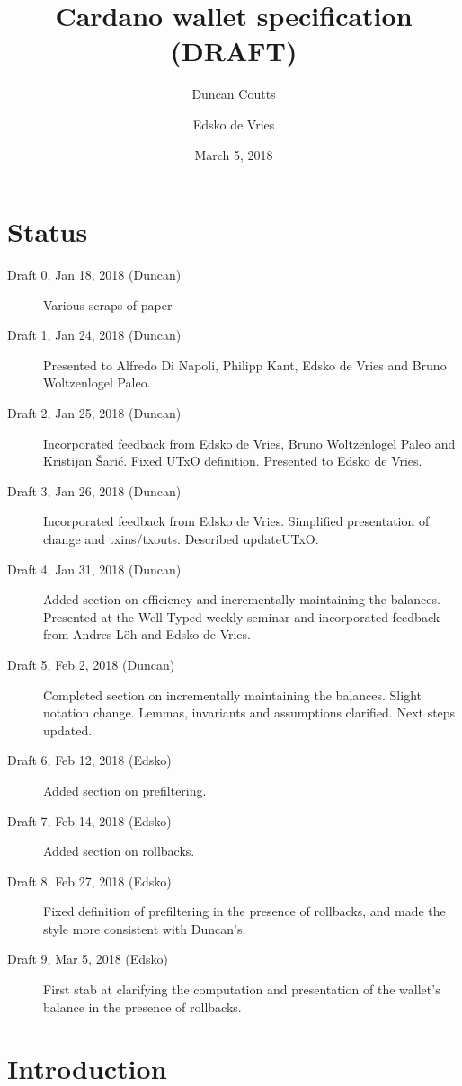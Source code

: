 \documentclass{article}
\begin{document}
\title{Cardano wallet specification (DRAFT)}
\author{Duncan Coutts \and Edsko de Vries}
\date{March 5, 2018}

\maketitle

\section*{Status}

\begin{description}
\item[Draft 0, Jan 18, 2018 (Duncan)] Various scraps of paper
\item[Draft 1, Jan 24, 2018 (Duncan)] Presented to Alfredo Di Napoli, Philipp Kant,
     Edsko de Vries and Bruno Woltzenlogel Paleo.
\item[Draft 2, Jan 25, 2018 (Duncan)] Incorporated feedback from Edsko de Vries,
     Bruno Woltzenlogel Paleo and Kristijan \v{S}ari\'{c}. Fixed UTxO
     definition. Presented to Edsko de Vries.
\item[Draft 3, Jan 26, 2018 (Duncan)] Incorporated feedback from Edsko de Vries.
     Simplified presentation of change and txins/txouts. Described updateUTxO.
\item[Draft 4, Jan 31, 2018 (Duncan)] Added section on efficiency and incrementally
     maintaining the balances. Presented at the Well-Typed weekly seminar and
     incorporated feedback from Andres L\"oh and Edsko de Vries.
\item[Draft 5, Feb 2, 2018 (Duncan)] Completed section on incrementally maintaining the
     balances. Slight notation change. Lemmas, invariants and assumptions
     clarified. Next steps updated.
\item[Draft 6, Feb 12, 2018 (Edsko)] Added section on prefiltering.
\item[Draft 7, Feb 14, 2018 (Edsko)] Added section on rollbacks.
\item[Draft 8, Feb 27, 2018 (Edsko)] Fixed definition of prefiltering in the presence
     of rollbacks, and made the style more consistent with Duncan's.
\item[Draft 9, Mar 5, 2018 (Edsko)] First stab at clarifying the computation and
     presentation of the wallet's balance in the presence of rollbacks.
\end{description}

\section{Introduction}
\end{document}
